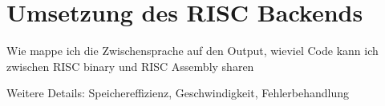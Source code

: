 \chapter{Umsetzung des RISC Backends}
\label{chap:build:backend}

Wie mappe ich die Zwischensprache auf den Output, wieviel Code kann ich zwischen RISC binary und RISC Assembly sharen

Weitere Details: Speichereffizienz, Geschwindigkeit, Fehlerbehandlung

